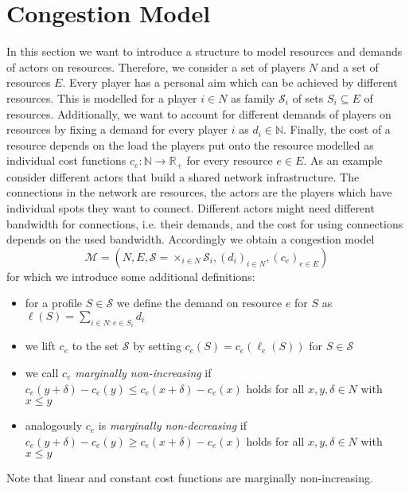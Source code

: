 \documentclass{scrartcl}
\theoremstyle{nonumberplain}
\newcommand{\tupel}[1]{\left(#1\right)}
\begin{document}
\section{Congestion Model}
In this section we want to introduce a structure to model resources and demands
of actors on resources. Therefore, we consider a set of players $N$ and a set
of resources $E$. Every player has a personal aim which can be achieved by
different resources. This is modelled for a player $i\in N$ as family
$\mathcal{S}_{i}$ of sets $S_{i}\subseteq E$ of resources. Additionally, we
want to account for different demands of players on resources by fixing a
demand for every player $i$ as $d_{i}\in\mathbb{N}$. Finally, the cost of a
resource depends on the load the players put onto the resource modelled as
individual cost functions $c_{e}:\mathbb{N}\rightarrow \mathbb{R}_{+}$ for
every resource $e\in E$. As an example consider different actors that build a
shared network infrastructure. The connections in the network are resources,
the actors are the players which have individual spots they want to connect.
Different actors might need different bandwidth for connections, i.e. their
demands, and the cost for using connections depends on the used bandwidth.
Accordingly we obtain a congestion model
\begin{equation*}
  \mathcal{M} = \tupel{N, E, \mathcal{S} = \times_{i\in N}\mathcal{S}_{i},
  (d_{i})_{i\in N}, (c_{e})_{e\in E}}
\end{equation*}
for which we introduce some additional definitions:
\begin{itemize}
  \item for a profile $S\in\mathcal{S}$ we define
    the demand on resource $e$ for $S$ as
    $\ell(S) = \sum_{i\in N:e\in S_{i}}d_{i}$
  \item we lift $c_{e}$ to the set $\mathcal{S}$ by setting
    $c_{e}(S) = c_{e}(\ell_{e}(S))$ for $S\in\mathcal{S}$
  \item we call $c_{e}$ \emph{marginally non-increasing} if
    $c_{e}(y + \delta) - c_{e}(y) \leq c_{e}(x + \delta) - c_{e}(x)$ holds
    for all $x,y,\delta\in N$ with $x\leq y$
  \item analogously $c_{e}$ is \emph{marginally non-decreasing} if
    $c_{e}(y + \delta) - c_{e}(y) \geq c_{e}(x + \delta) - c_{e}(x)$ holds
    for all $x,y,\delta\in N$ with $x\leq y$
\end{itemize}
Note that linear and constant cost functions are marginally non-increasing.
\end{document}
